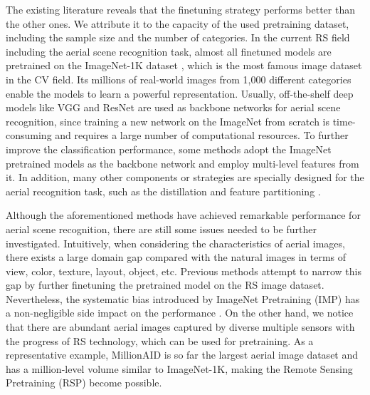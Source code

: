 \documentclass[10pt, journal,twoside]{IEEEtran}
\begin{document}
The existing literature \cite{asr_review} reveals that the finetuning strategy performs better than the other ones. We attribute it to the capacity of the used pretraining dataset, including the sample size and the number of categories. In the current RS field including the aerial scene recognition task, almost all finetuned models are pretrained on the ImageNet-1K dataset \cite{imagenet}, which is the most famous image dataset in the CV field. Its millions of real-world images from 1,000 different categories enable the models to learn a powerful representation. Usually, off-the-shelf deep models like VGG \cite{vgg} and ResNet \cite{resnet} are used as backbone networks for aerial scene recognition, since training a new network on the ImageNet from scratch is time-consuming and requires a large number of computational resources. To further improve the classification performance, some methods \cite{xu2021_dfagcn,sun_2019_GBNet} adopt the ImageNet pretrained models as the backbone network and employ multi-level features from it. In addition, many other components or strategies are specially designed for the aerial recognition task, such as the distillation \cite{ESDMBENet_2021_asr} and feature partitioning \cite{mgmlnet_asr_2021_featurepartioning}.

Although the aforementioned methods have achieved remarkable performance for aerial scene recognition, there are still some issues needed to be further investigated. Intuitively, when considering the characteristics of aerial images, there exists a large domain gap compared with the natural images in terms of view, color, texture, layout, object, etc. Previous methods attempt to narrow this gap by further finetuning the pretrained model on the RS image dataset. Nevertheless, the systematic bias introduced by ImageNet Pretraining (IMP) has a non-negligible side impact on the performance \cite{saumoco}. On the other hand, we notice that there are abundant aerial images captured by diverse multiple sensors with the progress of RS technology, which can be used for pretraining. As a representative example, MillionAID \cite{Long2021DiRS} is so far the largest aerial image dataset and has a million-level volume similar to ImageNet-1K, making the Remote Sensing Pretraining (RSP) become possible.
\end{document}
